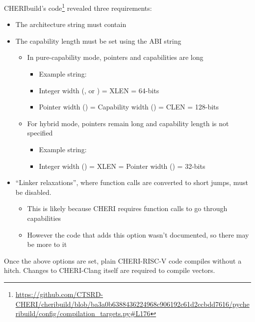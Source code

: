 CHERIbuild's code\footnote{\url{https://github.com/CTSRD-CHERI/cheribuild/blob/ba3a0b6388436224968c906192c61d2ccbdd7616/pycheribuild/config/compilation_targets.py\#L176}} revealed three requirements:
\begin{itemize}
    \item The architecture string must contain 
    \item The capability length must be set using the ABI string
    \begin{itemize}
        \item In pure-capability mode, pointers and capabilities are  long
        \begin{itemize}
            \item Example string: 
            \item Integer width (, or ) = XLEN = 64-bits
            \item Pointer width () = Capability width () = CLEN = 128-bits
        \end{itemize}
        \item For hybrid mode, pointers remain  long and capability length is not specified
        \begin{itemize}
            \item Example string: 
            \item Integer width () = XLEN = Pointer width () = 32-bits
        \end{itemize}
    \end{itemize}
    \item ``Linker relaxations'', where function calls are converted to short jumps\cite{chenCompilerSupportLinker2019}, must be disabled.
    \begin{itemize}
        \item This is likely because CHERI requires function calls to go through capabilities
        \item However the code that adds this option wasn't documented, so there may be more to it
    \end{itemize}
\end{itemize}

Once the above options are set, plain CHERI-RISC-V code compiles without a hitch.
Changes to CHERI-Clang itself are required to compile vectors.

